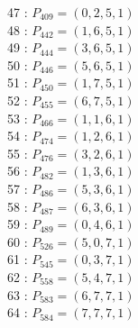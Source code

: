\documentclass{article}
\begin{document}
{\begin{multicols}{2}
47 : $P_{409}=( 0, 2, 5, 1 )$\\
48 : $P_{442}=( 1, 6, 5, 1 )$\\
49 : $P_{444}=( 3, 6, 5, 1 )$\\
50 : $P_{446}=( 5, 6, 5, 1 )$\\
51 : $P_{450}=( 1, 7, 5, 1 )$\\
52 : $P_{455}=( 6, 7, 5, 1 )$\\
53 : $P_{466}=( 1, 1, 6, 1 )$\\
54 : $P_{474}=( 1, 2, 6, 1 )$\\
55 : $P_{476}=( 3, 2, 6, 1 )$\\
56 : $P_{482}=( 1, 3, 6, 1 )$\\
57 : $P_{486}=( 5, 3, 6, 1 )$\\
58 : $P_{487}=( 6, 3, 6, 1 )$\\
59 : $P_{489}=( 0, 4, 6, 1 )$\\
60 : $P_{526}=( 5, 0, 7, 1 )$\\
61 : $P_{545}=( 0, 3, 7, 1 )$\\
62 : $P_{558}=( 5, 4, 7, 1 )$\\
63 : $P_{583}=( 6, 7, 7, 1 )$\\
64 : $P_{584}=( 7, 7, 7, 1 )$\\
\end{multicols}
}
\end{document}
